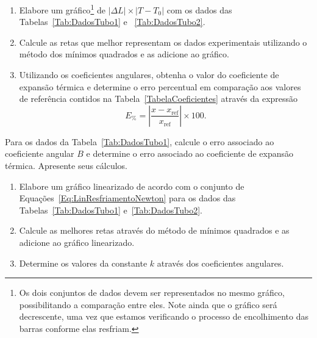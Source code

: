 \begin{question}[type={exam}]{1.5}
\begin{enumerate}[label=\roman*.]
\item Elabore um gráfico\footnote{Os dois conjuntos de dados devem ser representados no mesmo gráfico, possibilitando a comparação entre eles. Note ainda que o gráfico será decrescente, uma vez que estamos verificando o processo de encolhimento das barras conforme elas resfriam.} de $|\Delta L| \times |T - T_0|$ com os dados das Tabelas~\ref{Tab:DadosTubo1} e~ \ref{Tab:DadosTubo2}.

\item Calcule as retas que melhor representam os dados experimentais utilizando o método dos mínimos quadrados e as adicione ao gráfico.
\item Utilizando os coeficientes angulares, obtenha o valor do coeficiente de expansão térmica e determine o erro percentual em comparação aos valores de referência contidos na Tabela~\ref{TabelaCoeficientes} através da expressão
\begin{equation}
	E_{\%} = \left|\frac{x-x_{\textrm{ref}}}{x_{\textrm{ref}}}\right| \times 100.
\end{equation}
\end{enumerate}
\end{question}

\begin{question}[type={exam}]{2}
Para os dados da Tabela~\ref{Tab:DadosTubo1}, calcule o erro associado ao coeficiente angular $B$ e determine o erro associado ao coeficiente de expansão térmica. Apresente seus cálculos.
\end{question}


\begin{question}[type={exam}]{1.5}
\begin{enumerate}[label=\roman*.]
\item Elabore um gráfico linearizado de acordo com o conjunto de Equações~\eqref{Eq:LinResfriamentoNewton} para os dados das  Tabelas~\ref{Tab:DadosTubo1} e~\ref{Tab:DadosTubo2}.
\item Calcule as melhores retas através do método de mínimos quadrados e as adicione ao gráfico linearizado.
\item Determine os valores da constante $k$ através dos coeficientes angulares.
\end{enumerate}
\end{question}

